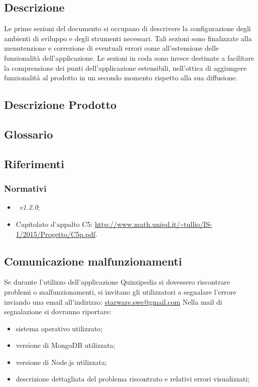 \documentclass[12pt,a4paper]{article}
\begin{document}
	\subsection{Descrizione}
	Le prime sezioni del documento si occupano di descrivere la configurazione degli ambienti di sviluppo e degli strumenti necessari. Tali sezioni sono finalizzate alla menutenzione e correzione di eventuali errori come all'estensione delle funzionalità dell'applicazione. Le sezioni in coda sono invece destinate a facilitare la comprensione dei punti dell'applicazione estensibili, nell'ottica di aggiungere funzionalità al prodotto in un secondo momento rispetto alla sua diffusione.
	
	\subsection{Descrizione Prodotto}
	\descrizioneProdotto
	
	\subsection{Glossario}
	\glossarioPrint
	
	\subsection{Riferimenti}
	\subsubsection{Normativi}
	\begin{itemize}
		\item \NdP\ \textit{v1.2.0};
		\item Capitolato d'appalto C5: \url{http://www.math.unipd.it/~tullio/IS-1/2015/Progetto/C5p.pdf}.
	\end{itemize}
		
		
	\subsection{Comunicazione malfunzionamenti}
		Se durante l’utilizzo dell’applicazione Quizzipedia si dovessero riscontrare problemi o
		malfunzionamenti, si invitano gli utilizzatori a segnalare l’errore inviando una email
		all’indirizzo:
		\url{starware.swe@gmail.com}
		Nella mail di segnalazione si dovranno riportare:
		\begin{itemize}
			\item sistema operativo utilizzato;
			\item versione di MongoDB utilizzata;
			\item versione di Node.js utilizzata;
			\item descrizione dettagliata del problema riscontrato e relativi errori visualizzati;
		\end{itemize}
\end{document}
